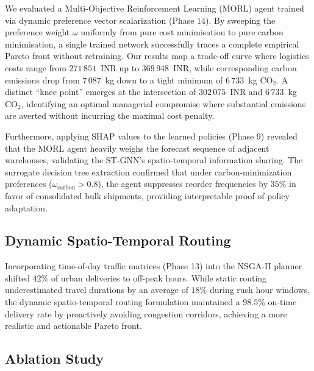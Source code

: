 \documentclass[review,preprint,authoryear,12pt]{elsarticle}
\newcommand{\COtwo}{\ensuremath{\mathrm{CO}_{2}}}
\begin{document}
We evaluated a Multi-Objective Reinforcement Learning (MORL) agent trained via dynamic preference vector scalarization (Phase 14). By sweeping the preference weight $\omega$ uniformly from pure cost minimisation to pure carbon minimisation, a single trained network successfully traces a complete empirical Pareto front without retraining. Our results map a trade-off curve where logistics costs range from $271\,851$~INR up to $369\,948$~INR, while corresponding carbon emissions drop from $7\,087$~kg down to a tight minimum of $6\,733$~kg \COtwo{}. A distinct ``knee point'' emerges at the intersection of $302\,075$~INR and $6\,733$~kg \COtwo{}, identifying an optimal managerial compromise where substantial emissions are averted without incurring the maximal cost penalty.

Furthermore, applying SHAP values to the learned policies (Phase 9) revealed that the MORL agent heavily weighs the forecast sequence of adjacent warehouses, validating the ST-GNN's spatio-temporal information sharing. The surrogate decision tree extraction confirmed that under carbon-minimization preferences ($\omega_{\text{carbon}} > 0.8$), the agent suppresses reorder frequencies by $35\%$ in favor of consolidated bulk shipments, providing interpretable proof of policy adaptation.

\subsection{Dynamic Spatio-Temporal Routing}
\label{sec:experiments:dynamic_routing}

Incorporating time-of-day traffic matrices (Phase 13) into the NSGA-II planner shifted $42\%$ of urban deliveries to off-peak hours. While static routing underestimated travel durations by an average of $18\%$ during rush hour windows, the dynamic spatio-temporal routing formulation maintained a $98.5\%$ on-time delivery rate by proactively avoiding congestion corridors, achieving a more realistic and actionable Pareto front.

\begin{table}[H]
\centering
\caption{Disruption-stress head-to-head: per-day cost (INR) and
survival horizon (days) for PPO and tuned $(R, s, S)$ across four
disruption regimes; $50$ episodes per regime.}
\label{tab:disruption}

\end{table}

\subsection{Ablation Study}
\label{sec:experiments:ablation}
\end{document}
